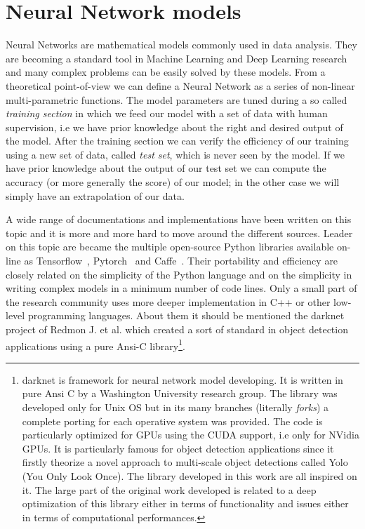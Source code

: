 \documentclass{standalone}
\begin{document}
\section[Neural Network models]{Neural Network models}\label{NN:nn}

Neural Networks are mathematical models commonly used in data analysis.
They are becoming a standard tool in Machine Learning and Deep Learning research and many complex problems can be easily solved by these models.
From a theoretical point-of-view we can define a Neural Network as a series of non-linear multi-parametric functions.
The model parameters are tuned during a so called \emph{training section} in which we feed our model with a set of data with human supervision, i.e we have prior knowledge about the right and desired output of the model.
After the training section we can verify the efficiency of our training using a new set of data, called \emph{test set}, which is never seen by the model.
If we have prior knowledge about the output of our test set we can compute the accuracy (or more generally the score) of our model; in the other case we will simply have an extrapolation of our data.

A wide range of documentations and implementations have been written on this topic and it is more and more hard to move around the different sources.
Leader on this topic are became the multiple open-source \textsf{Python} libraries available on-line as \textsf{Tensorflow}~\cite{tensorflow2015-whitepaper}, \textsf{Pytorch}~\cite{paszke2017automatic} and \textsf{Caffe}~\cite{Jia:2014:Caffe}.
Their portability and efficiency are closely related on the simplicity of the \textsf{Python} language and on the simplicity in writing complex models in a minimum number of code lines.
Only a small part of the research community uses more deeper implementation in \textsf{C++} or other low-level programming languages.
About them it should be mentioned the \textsf{darknet project} of Redmon J. et al. which created a sort of standard in object detection applications using a pure \textsf{Ansi-C} library\footnote{
  \textsf{darknet} is framework for neural network model developing.
  It is written in pure \textsf{Ansi C} by a Washington University research group.
  The library was developed only for Unix OS but in its many branches (literally \emph{forks}) a complete porting for each operative system was provided.
  The code is particularly optimized for GPUs using the CUDA support, i.e only for NVidia GPUs.
  It is particularly famous for object detection applications since it firstly theorize a novel approach to multi-scale object detections called Yolo (You Only Look Once).
  The library developed in this work are all inspired on it.
  The large part of the original work developed is related to a deep optimization of this library either in terms of functionality and issues either in terms of computational performances.
}.
\end{document}
